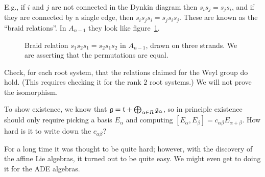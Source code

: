E.g., if $i$ and $j$ are not connected in the Dynkin diagram then
$s_is_j = s_js_i$, and if they are connected by a single edge, then
$s_is_js_i = s_js_is_j$. These are known as the ``braid relations''. In
$A_{n-1}$ they look like figure~\ref{fig:braid}.

\begin{figure}[!htbp]
\centering
{}
\caption{Braid relation $s_1s_2s_1 = s_2s_1s_2$ in $A_{n-1}$, drawn on three
strands. We are asserting that the permutations are equal.}
\label{fig:braid}
\end{figure}


\begin{exercise}
Check, for each root system, that the relations claimed for the Weyl group do
hold. (This requires checking it for the rank $2$ root systems.) We will not
prove the isomorphism.
\end{exercise}

\begin{remark}
To show existence, we know that $\mathfrak{g} = \mathfrak{t} + \bigoplus_{\alpha \in R} \mathfrak{g}_\alpha$,
so in principle existence should only require picking a basis $E_\alpha$ and
computing $[E_\alpha, E_\beta] = c_{\alpha\beta}E_{\alpha+\beta}$. How hard is
it to write down the $c_{\alpha\beta}$?

For a long time it was thought to be quite hard; however, with the discovery of
the affine Lie algebras, it turned out to be quite easy. We might even get to
doing it for the ADE algebras.
\end{remark}

